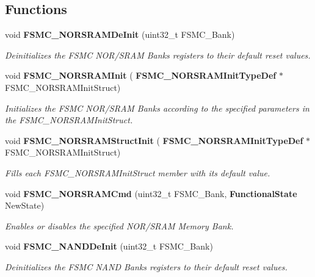 \subsection*{Functions}
\begin{DoxyCompactItemize}
\item 
void \textbf{ F\+S\+M\+C\+\_\+\+N\+O\+R\+S\+R\+A\+M\+De\+Init} (uint32\+\_\+t F\+S\+M\+C\+\_\+\+Bank)
\begin{DoxyCompactList}\small\item\em Deinitializes the F\+S\+MC N\+O\+R/\+S\+R\+AM Banks registers to their default reset values. \end{DoxyCompactList}\item 
void \textbf{ F\+S\+M\+C\+\_\+\+N\+O\+R\+S\+R\+A\+M\+Init} (\textbf{ F\+S\+M\+C\+\_\+\+N\+O\+R\+S\+R\+A\+M\+Init\+Type\+Def} $\ast$F\+S\+M\+C\+\_\+\+N\+O\+R\+S\+R\+A\+M\+Init\+Struct)
\begin{DoxyCompactList}\small\item\em Initializes the F\+S\+MC N\+O\+R/\+S\+R\+AM Banks according to the specified parameters in the F\+S\+M\+C\+\_\+\+N\+O\+R\+S\+R\+A\+M\+Init\+Struct. \end{DoxyCompactList}\item 
void \textbf{ F\+S\+M\+C\+\_\+\+N\+O\+R\+S\+R\+A\+M\+Struct\+Init} (\textbf{ F\+S\+M\+C\+\_\+\+N\+O\+R\+S\+R\+A\+M\+Init\+Type\+Def} $\ast$F\+S\+M\+C\+\_\+\+N\+O\+R\+S\+R\+A\+M\+Init\+Struct)
\begin{DoxyCompactList}\small\item\em Fills each F\+S\+M\+C\+\_\+\+N\+O\+R\+S\+R\+A\+M\+Init\+Struct member with its default value. \end{DoxyCompactList}\item 
void \textbf{ F\+S\+M\+C\+\_\+\+N\+O\+R\+S\+R\+A\+M\+Cmd} (uint32\+\_\+t F\+S\+M\+C\+\_\+\+Bank, \textbf{ Functional\+State} New\+State)
\begin{DoxyCompactList}\small\item\em Enables or disables the specified N\+O\+R/\+S\+R\+AM Memory Bank. \end{DoxyCompactList}\item 
void \textbf{ F\+S\+M\+C\+\_\+\+N\+A\+N\+D\+De\+Init} (uint32\+\_\+t F\+S\+M\+C\+\_\+\+Bank)
\begin{DoxyCompactList}\small\item\em Deinitializes the F\+S\+MC N\+A\+ND Banks registers to their default reset values. \end{DoxyCompactList}\item 

\end{DoxyCompactItemize}
